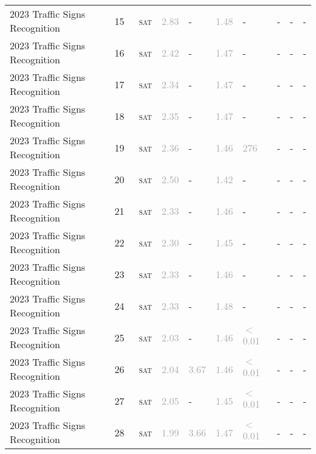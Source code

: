 \begin{center}
{\begin{longtable}{@{}llllllllll@{}}
2023 Traffic Signs Recognition & 15 & ~\textsc{sat} & \textcolor{darkgray}{2.83} & - & \textcolor{darkgray}{1.48} & - & - & - & - \\
2023 Traffic Signs Recognition & 16 & ~\textsc{sat} & \textcolor{darkgray}{2.42} & - & \textcolor{darkgray}{1.47} & - & - & - & - \\
2023 Traffic Signs Recognition & 17 & ~\textsc{sat} & \textcolor{darkgray}{2.34} & - & \textcolor{darkgray}{1.47} & - & - & - & - \\
2023 Traffic Signs Recognition & 18 & ~\textsc{sat} & \textcolor{darkgray}{2.35} & - & \textcolor{darkgray}{1.47} & - & - & - & - \\
2023 Traffic Signs Recognition & 19 & ~\textsc{sat} & \textcolor{darkgray}{2.36} & - & \textcolor{darkgray}{1.46} & \textcolor{darkgray}{276} & - & - & - \\
2023 Traffic Signs Recognition & 20 & ~\textsc{sat} & \textcolor{darkgray}{2.50} & - & \textcolor{darkgray}{1.42} & - & - & - & - \\
2023 Traffic Signs Recognition & 21 & ~\textsc{sat} & \textcolor{darkgray}{2.33} & - & \textcolor{darkgray}{1.46} & - & - & - & - \\
2023 Traffic Signs Recognition & 22 & ~\textsc{sat} & \textcolor{darkgray}{2.30} & - & \textcolor{darkgray}{1.45} & - & - & - & - \\
2023 Traffic Signs Recognition & 23 & ~\textsc{sat} & \textcolor{darkgray}{2.33} & - & \textcolor{darkgray}{1.46} & - & - & - & - \\
2023 Traffic Signs Recognition & 24 & ~\textsc{sat} & \textcolor{darkgray}{2.33} & - & \textcolor{darkgray}{1.48} & - & - & - & - \\
2023 Traffic Signs Recognition & 25 & ~\textsc{sat} & \textcolor{darkgray}{2.03} & - & \textcolor{darkgray}{1.46} & \textcolor{darkgray}{$<$0.01} & - & - & - \\
2023 Traffic Signs Recognition & 26 & ~\textsc{sat} & \textcolor{darkgray}{2.04} & \textcolor{darkgray}{3.67} & \textcolor{darkgray}{1.46} & \textcolor{darkgray}{$<$0.01} & - & - & - \\
2023 Traffic Signs Recognition & 27 & ~\textsc{sat} & \textcolor{darkgray}{2.05} & - & \textcolor{darkgray}{1.45} & \textcolor{darkgray}{$<$0.01} & - & - & - \\
2023 Traffic Signs Recognition & 28 & ~\textsc{sat} & \textcolor{darkgray}{1.99} & \textcolor{darkgray}{3.66} & \textcolor{darkgray}{1.47} & \textcolor{darkgray}{$<$0.01} & - & - & - \\

\end{longtable}}
\end{center}

